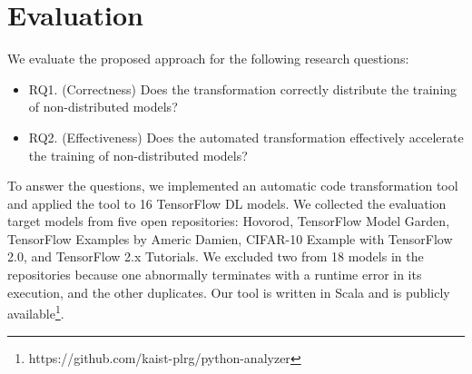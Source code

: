 \section{Evaluation}\label{sec:eval}
We evaluate the proposed approach for the following research questions:
\begin{itemize}
\item RQ1. (Correctness) Does the transformation correctly distribute the
  training of non-distributed models?
\item RQ2. (Effectiveness) Does the automated transformation effectively
  accelerate the training of non-distributed models?
\end{itemize}

\noindent
To answer the questions, we implemented an automatic code transformation tool
and applied the tool to 16 TensorFlow DL models.
We collected the evaluation target models from five open repositories: 
Hovorod\cite{horovodgithub}, TensorFlow Model Garden\cite{tfmodelgarden},
TensorFlow Examples by Americ Damien\cite{tfexamplesdamien},
CIFAR-10 Example with TensorFlow 2.0\cite{cifar10github}, and
TensorFlow 2.x Tutorials\cite{tf2tutogithub}.
We excluded two from 18 models in the repositories because one abnormally
terminates with a runtime error in its execution, and the other duplicates.
Our tool is written in Scala and is publicly
available\footnote{https://github.com/kaist-plrg/python-analyzer}.

